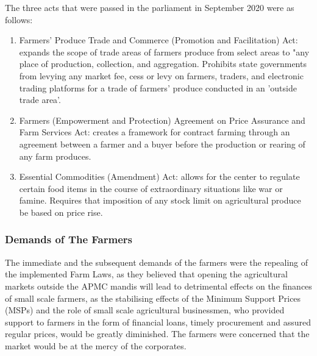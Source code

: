 \documentclass{article}
\begin{document}
The three acts that were passed in the parliament in September 2020 were as follows:
\begin{enumerate}
  \item Farmers' Produce Trade and Commerce (Promotion and Facilitation) Act: expands the scope of trade areas of farmers produce from select areas to "any place of production, collection, and aggregation. Prohibits state governments from levying any market fee, cess or levy on farmers, traders, and electronic trading platforms for a trade of farmers' produce conducted in an 'outside trade area'.
  \item Farmers (Empowerment and Protection) Agreement on Price Assurance and Farm Services Act: creates a framework for contract farming through an agreement between a farmer and a buyer before the production or rearing of any farm produces.
  \item Essential Commodities (Amendment) Act: allows for the center to regulate certain food items in the course of extraordinary situations like war or famine. Requires that imposition of any stock limit on agricultural produce be based on price rise.
\end{enumerate}
\subsubsection{Demands of The Farmers}
The immediate and the subsequent demands of the farmers were the repealing of the implemented Farm Laws, as they believed that opening the agricultural markets outside the APMC mandis will lead to detrimental effects on the finances of small scale farmers, as the stabilising effects of the Minimum Support Prices (MSPs) and the role of small scale agricultural businessmen, who provided support to farmers in the form of financial loans, timely procurement and assured regular prices, would be greatly diminished. The farmers were concerned that the market would be at the mercy of the corporates. 
\end{document}
